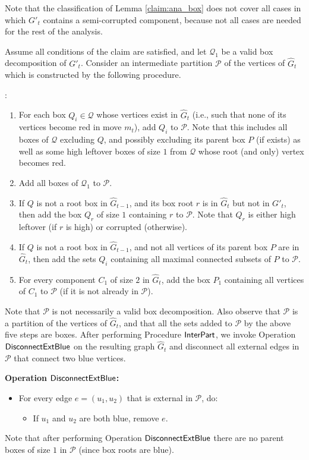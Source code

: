 \documentclass[11pt]{article}
\def\Proof{\par\noindent{\bf Proof:~}}
\def\dnsitem{\vspace{-7pt}\item}
\theoremstyle{definition}
\def\interpart{\mbox{\sf InterPart}}
\def\discblue{\mbox{\sf DisconnectExtBlue}}
\begin{document}
Note that the classification of Lemma \ref{claim:ana_box} does not cover all cases in which $G'_t$ contains a semi-corrupted component, because not all cases are needed for the rest of the analysis.
\Proof
Assume all conditions of the claim are satisfied, and let $\mathcal{Q}_1$ be a valid box decomposition of $G'_t$.
Consider an intermediate partition $\mathcal{P}$ of the vertices of $\hat{G}_{t}$ which is constructed by the following procedure.

\smallskip
\par\noindent{\bf Procedure $\interpart$}:
\begin{enumerate}
	\dnsitem For each box $Q_i \in \mathcal{Q}$ whose vertices exist in $\hat{G}_{t}$ (i.e., such that none of its vertices become red in move $m_{t}$),
	add $Q_i$ to $\mathcal{P}$.
	Note that this includes all boxes of $\mathcal{Q}$ excluding $Q$, and possibly excluding its parent box $P$ (if exists) 
	as well as some high leftover boxes of size $1$ from $\mathcal{Q}$ whose root (and only) vertex becomes red.
	\dnsitem Add all boxes of $\mathcal{Q}_1$ to $\mathcal{P}$.

	\dnsitem If $Q$ is not a root box in $\hat{G}_{t-1}$, and its box root $r$ is in $\hat{G}_{t}$ but not in $G'_{t}$,
	then add the box $Q_r$ of size $1$ containing $r$ to $\mathcal{P}$.
	Note that $Q_r$ is either high leftover (if $r$ is high) or corrupted (otherwise).

	\dnsitem If $Q$ is not a root box in $\hat{G}_{t-1}$, and not all vertices of its parent box $P$ are in $\hat{G}_t$, 
	then add the sets $Q_i$ containing all maximal connected subsets of $P$ to $\mathcal{P}$.
	\dnsitem For every component $C_1$ of size $2$ in $\hat{G}_{t}$, 
	add the box $P_1$ containing all vertices of $C_1$ to $\mathcal{P}$ (if it is not already in $\mathcal{P}$). 
\end{enumerate}
Note that $\mathcal{P}$ is not necessarily a valid box decomposition.
Also observe that $\mathcal{P}$ is a partition of the vertices of $\hat{G}_{t}$, and that all the sets added to $\mathcal{P}$ by the above five steps are boxes.
After performing Procedure $\interpart$, we invoke Operation $\discblue$ on the resulting graph $\hat{G}_{t}$ and disconnect all external edges in $\mathcal{P}$ that connect two blue vertices.
\smallskip
\par\noindent
{\bf Operation $\discblue$:}
\begin{itemize}
\dnsitem[] For every edge $e = (u_1, u_2)$ that is external in $\mathcal{P}$, do:
	\begin{itemize}
		\dnsitem[] If $u_1$ and $u_2$ are both blue, remove $e$.
	\end{itemize}
\end{itemize}
\bigskip
Note that after performing Operation $\discblue$ there are no parent boxes of size $1$ in $\mathcal{P}$ (since box roots are blue).
\end{document}
